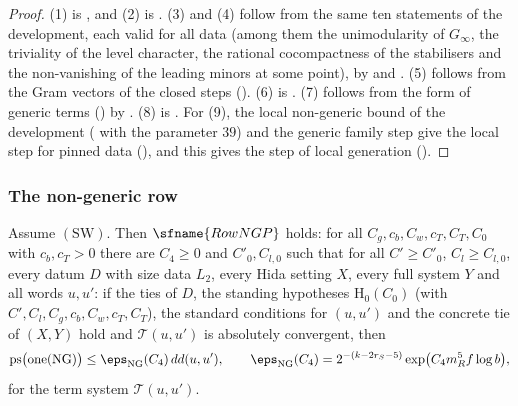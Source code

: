 \begin{proof}
(1) is , and (2) is
. (3) and (4) follow from the same ten statements of the
development, each valid for all data (among them the unimodularity of $G_\infty$, the triviality of the level
character, the rational cocompactness of the stabilisers and the non-vanishing of the leading minors at some
point), by  and
. (5) follows from the Gram vectors
of the closed steps (). (6) is
. (7) follows from the form of generic terms
() by .
(8) is . For (9), the local non-generic bound of the development
( with the parameter $39$) and the generic family
step give the local step for pinned data (), and this gives the
step of local generation ().
\end{proof}

\subsubsection{The non-generic row}

\begin{theorem}\label{pf:sh-flag:rowng}
Assume $(\mathrm{SW})$. Then $\sfname{RowNGP}$ holds: for all $C_g,c_b,C_w,c_T,C_T,C_0$ with $c_b,c_T>0$ there are
$C_4\ge0$ and $C'_0,C_{l,0}$ such that for all $C'\ge C'_0$, $C_l\ge C_{l,0}$, every datum $D$ with size data
$L_2$, every Hida setting $X$, every full system $Y$ and all words $u,u'$: if the ties of $D$, the standing
hypotheses $\mathrm{H}_0(C_0)$ (with $C',C_l,C_g,c_b,C_w,c_T,C_T$), the standard conditions for $(u,u')$ and the
concrete tie of $(X,Y)$ hold and $\mathcal T(u,u')$ is absolutely convergent, then
\[
\mathrm{ps}\bigl(\mathrm{one}(\mathrm{NG})\bigr)\le\eps_{\mathrm{NG}}(C_4)\,dd(u,u'),\qquad
\eps_{\mathrm{NG}}(C_4)=2^{-(k-2r_S-5)}\exp\bigl(C_4m_R^5f\log b\bigr),
\]
for the term system $\mathcal T(u,u')$.
\end{theorem}

